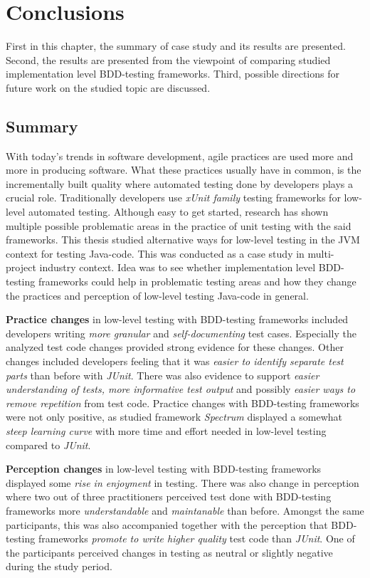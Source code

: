\chapter{Conclusions}
\label{chapter:conclusions}
First in this chapter, the summary of case study and its results are presented. Second, the results are presented
from the viewpoint of comparing studied implementation level BDD-testing frameworks. Third, possible directions for future work
on the studied topic are discussed.

\section{Summary}
With today's trends in software development, agile practices are used more and more in producing software. What these practices
usually have in common, is the incrementally built quality where automated testing done by developers plays a crucial role.
Traditionally developers use \textit{xUnit family} testing frameworks for low-level automated testing. Although easy
to get started, research has shown multiple possible problematic areas in the practice of unit testing with the said
frameworks. This thesis studied alternative ways for low-level testing in the JVM context for testing Java-code.
This was conducted as a case study in multi-project industry context.
Idea was to see whether implementation level BDD-testing frameworks could help in problematic testing areas and how they
change the practices and perception of low-level testing Java-code in general.

\textbf{Practice changes} in low-level testing with BDD-testing frameworks included developers writing \textit{more granular}
and \textit{self-documenting} test cases. Especially the analyzed test code changes provided strong evidence for these changes.
Other changes included developers feeling that it was \textit{easier to identify separate test parts} than before with
\textit{JUnit}. There was also evidence to support \textit{easier understanding of tests, more informative test output} and
possibly \textit{easier ways to remove repetition} from test code. Practice changes with BDD-testing frameworks were not only
positive, as studied framework \textit{Spectrum} displayed a somewhat \textit{steep learning curve} with more time
and effort needed in low-level testing compared to \textit{JUnit}.

\textbf{Perception changes} in low-level testing with BDD-testing frameworks displayed some \textit{rise in enjoyment} in testing.
There was also change in perception where two out of three practitioners perceived test done with BDD-testing frameworks
more \textit{understandable} and \textit{maintanable} than before. Amongst the same participants, this was also accompanied
together with the perception that BDD-testing frameworks \textit{promote to write higher quality} test code than \textit{JUnit}.
One of the participants perceived changes in testing as neutral or slightly negative during the study period.

